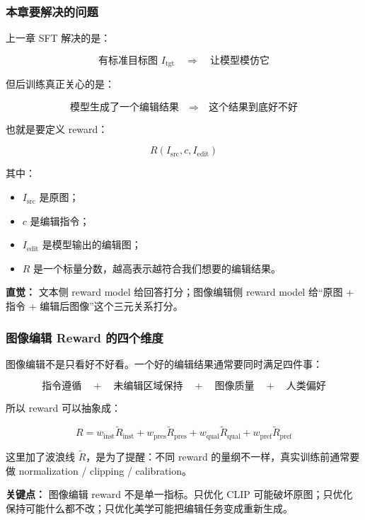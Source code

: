 \subsubsection{本章要解决的问题}

上一章 SFT 解决的是：

\[
\text{有标准目标图 } I_\text{tgt}
\quad\Rightarrow\quad
\text{让模型模仿它}
\]

但后训练真正关心的是：

\[
\text{模型生成了一个编辑结果}
\quad\Rightarrow\quad
\text{这个结果到底好不好}
\]

也就是要定义 reward：

\[
R(I_\text{src}, c, I_\text{edit})
\]

其中：

\begin{itemize}[leftmargin=1.5em]
  \item $I_\text{src}$ 是原图；
  \item $c$ 是编辑指令；
  \item $I_\text{edit}$ 是模型输出的编辑图；
  \item $R$ 是一个标量分数，越高表示越符合我们想要的编辑结果。
\end{itemize}

\begin{intubox}
\textbf{直觉：} 文本侧 reward model 给回答打分；图像编辑侧 reward model 给“原图 + 指令 + 编辑后图像”这个三元关系打分。
\end{intubox}

\subsubsection{图像编辑 Reward 的四个维度}

图像编辑不是只看好不好看。一个好的编辑结果通常要同时满足四件事：

\[
\text{指令遵循}
\quad
+
\quad
\text{未编辑区域保持}
\quad
+
\quad
\text{图像质量}
\quad
+
\quad
\text{人类偏好}
\]

所以 reward 可以抽象成：

\[
R
=
w_\text{inst}\widetilde{R}_\text{inst}
+
w_\text{pres}\widetilde{R}_\text{pres}
+
w_\text{qual}\widetilde{R}_\text{qual}
+
w_\text{pref}\widetilde{R}_\text{pref}
\]

这里加了波浪线 $\widetilde{R}$，是为了提醒：不同 reward 的量纲不一样，真实训练前通常要做 normalization / clipping / calibration。

\begin{warnbox}
\textbf{关键点：} 图像编辑 reward 不是单一指标。只优化 CLIP 可能破坏原图；只优化保持可能什么都不改；只优化美学可能把编辑任务变成重新生成。
\end{warnbox}

